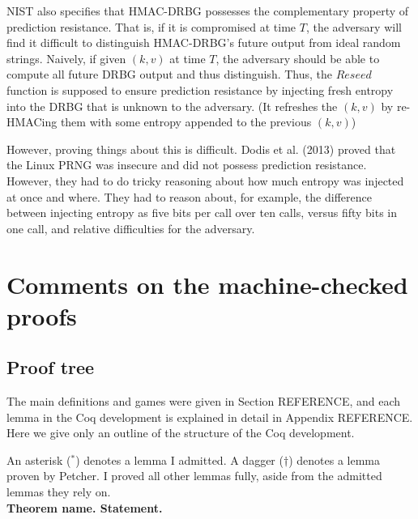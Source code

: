 \documentclass[12pt,lot, lof]{puthesis}
\begin{document}
{%
NIST also specifies that HMAC-DRBG possesses the complementary property of prediction resistance. That is, if it is compromised at time $T$, the adversary will find it difficult to distinguish HMAC-DRBG's future output from ideal random strings. Naively, if given $(k, v)$ at time $T$, the adversary should be able to compute all future DRBG output and thus distinguish. Thus, the $Reseed$ function is supposed to ensure prediction resistance by injecting fresh entropy into the DRBG that is unknown to the adversary. (It refreshes the $(k,v)$ by re-HMACing them with some entropy appended to the previous $(k,v)$)

However, proving things about this is difficult. Dodis et al. (2013) proved that the Linux PRNG was insecure and did not possess prediction resistance. However, they had to do tricky reasoning about how much entropy was injected at once and where. They had to reason about, for example, the difference between injecting entropy as five bits per call over ten calls, versus fifty bits in one call, and relative difficulties for the adversary. 



\chapter{Comments on the machine-checked proofs}

\section{Proof tree}

The main definitions and games were given in Section REFERENCE, and each lemma in the Coq development is explained in detail in Appendix REFERENCE. Here we give only an outline of the structure of the Coq development.

An asterisk ($^*$) denotes a lemma I admitted. A dagger ($\dag$) denotes a lemma proven by Petcher. I proved all other lemmas fully, aside from the admitted lemmas they rely on. \\

\textbf{Theorem name. Statement.}

}
\end{document}
